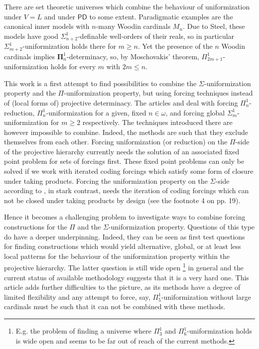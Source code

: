 \documentclass[a4paper,11pt]{article}
\newcommand{\PD}{\mathsf{PD}}
\begin{document}
There are set theoretic universes which combine the behaviour of uniformization under $V=L$ and under $\PD$ to some extent. Paradigmatic examples are the canonical inner models with $n$-many Woodin cardinals $M_n$. Due to Steel, these models have good $\Sigma^1_{n+2}$-definable well-orders of their reals, so in particular $\Sigma^1_{m+2}$-uniformization holds there for $m\geq n$. Yet the presence of the $n$ Woodin cardinals implies $\mathbf{\Pi}^1_n$-determinacy, so, by Moschovakis' theorem, $\Pi^1_{2m+1}$-uniformization holds for every $m$ with $2m\leq n$. 


 
This work is a first attempt to find possibilities to combine the $\Sigma$-uniformization property and the $\Pi$-uniformization property, but using forcing techniques instead of (local forms of) projective determinacy. The articles \cite{Reduction} \cite{Uniformization} and \cite{BPFA and uniformization} deal with forcing $\Pi^1_n$-reduction, $\Pi^1_n$-uniformization for a given, fixed $n \in \omega$, and forcing global $\Sigma^1_m$-uniformization for $m \ge 2$ respectively. 
The techniques introduced there are however impossible to combine. Indeed, the methods are such that they exclude themselves from each other. Forcing uniformization (or reduction) on the $\Pi$-side of the projective hierarchy currently needs the solution of an associated fixed point problem for sets of forcings first. These fixed point problems can only be solved if we work with iterated coding forcings which satisfy some form of closure under taking products.
Forcing the uniformization property on the $\Sigma$-side according to \cite{BPFA and uniformization}, in stark contrast, needs the iteration of coding forcings which can not be closed under taking products by design (see the footnote 4 on pp. 19). 


Hence it becomes a challenging problem to investigate ways to combine forcing constructions for the $\Pi$ and the $\Sigma$-uniformization property. 
Questions of this type do have a deeper underpinning. Indeed, they can be seen as first test questions for finding constructions which would yield alternative, global, or at least less local patterns for the behaviour of the uniformization property within the projective hierarchy. The latter question is still wide open \footnote{E.g. the problem of finding a universe where $\Pi^1_3$ and $\Pi^1_6$-uniformization holds is wide open and seems to be far out of reach of the current methods.} in general and the current status of available methodology suggests that it is a very hard one. This article adds further difficulties to the picture, as its methods have a degree of limited flexibility and any attempt to force, say, $\Pi^1_5$-uniformization without large cardinals must be such that it can not be combined with these methods.
\end{document}
